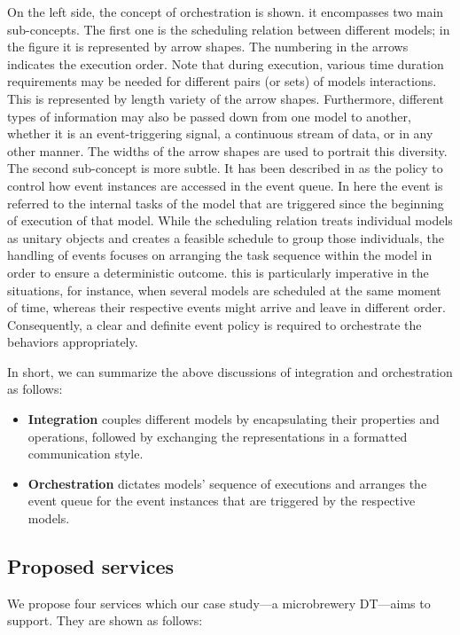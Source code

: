 \documentclass[journal,onecolumn]{IEEEtran} %
\begin{document}
On the left side, the concept of orchestration is shown. it encompasses two main sub-concepts. The first one is the scheduling relation between different models; in the figure it is represented by arrow shapes. The numbering in the arrows indicates the execution order. Note that during execution, various time duration requirements may be needed for different pairs (or sets) of models interactions. This is represented by length variety of the arrow shapes. Furthermore, different types of information may also be passed down from one model to another, whether it is an event-triggering signal, a continuous stream of data, or in any other manner. The widths of the arrow shapes are used to portrait this diversity. The second sub-concept is more subtle. It has been described in \cite{Ptolemaeus2014} as the policy to control how event instances are accessed in the event queue. In here the event is referred to the internal tasks of the model that are triggered since the beginning of execution of that model. While the scheduling relation treats individual models as unitary objects and creates a feasible schedule to group those individuals, the handling of events focuses on arranging the task sequence within the model in order to ensure a deterministic outcome. this is particularly imperative in the situations, for instance, when several models are scheduled at the same moment of time, whereas their respective events might arrive and leave in different order. Consequently, a clear and definite event policy is required to orchestrate the behaviors appropriately.

In short, we can summarize the above discussions of integration and orchestration as follows:
\begin{itemize}

  \item \textbf{Integration} couples different models by encapsulating their properties and operations, followed by exchanging the representations in a formatted communication style.

  \item \textbf{Orchestration} dictates models' sequence of executions and arranges the event queue for the event instances that are triggered by the respective models.

\end{itemize}


\subsection{Proposed services}\label{sec:services}
We propose four services which our case study---a microbrewery DT---aims to support. They are shown as follows:
\end{document}
